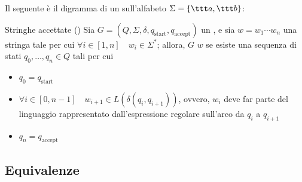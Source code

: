 \documentclass[a4paper, 12pt]{report}
\begin{document}
    \begin{example}[\GNFA]
        Il seguente è il digramma di un \GNFA sull'alfabeto $\Sigma = \{ \ttt a, \ttt b \}$:

    \end{example}

    \begin{frameddefn}{Stringhe accettate (\GNFA)}
        Sia $G = (Q, \Sigma, \delta, q_{\mathrm{start}}, q_{\mathrm{accept}})$ un \GNFA, e sia $w = w_1\cdots w_n$ una stringa tale per cui $\forall i \in [1, n] \quad w_i \in \Sigma^*$; allora, $G$  $w$ se esiste una sequenza di stati $q_0, \ldots, q_n \in Q$ tali per cui

        \begin{itemize}
            \item $q_0 = q_{\mathrm{start}}$
            \item $\forall i \in [0, n - 1] \quad w_{i + 1} \in L(\delta(q_i, q_{i + 1}))$, ovvero, $w_i$ deve far parte del linguaggio rappresentato dall'espressione regolare sull'arco da $q_i$ a $q_{i + 1}$
            \item $q_n = q_{\mathrm{accept}}$
        \end{itemize}
    \end{frameddefn}

    \subsection{Equivalenze}
\end{document}
